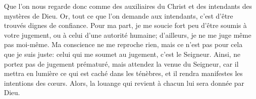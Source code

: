 Que l’on nous regarde donc comme des auxiliaires du Christ
	et des intendants des mystères de Dieu.
Or, tout ce que l’on demande aux intendants, c’est d’être trouvés dignes de confiance.
Pour ma part, je me soucie fort peu d’être soumis à votre jugement,
	ou à celui d’une autorité humaine;
	d’ailleurs, je ne me juge même pas moi-même.
Ma conscience ne me reproche rien, mais ce n’est pas pour cela que je suis juste:
	celui qui me soumet au jugement, c’est le Seigneur.
Ainsi, ne portez pas de jugement prématuré, mais attendez la venue du Seigneur,
	car il mettra en lumière ce qui est caché dans les ténèbres,
	et il rendra manifestes les intentions des cœurs.
Alors, la louange qui revient à chacun lui sera donnée par Dieu.
